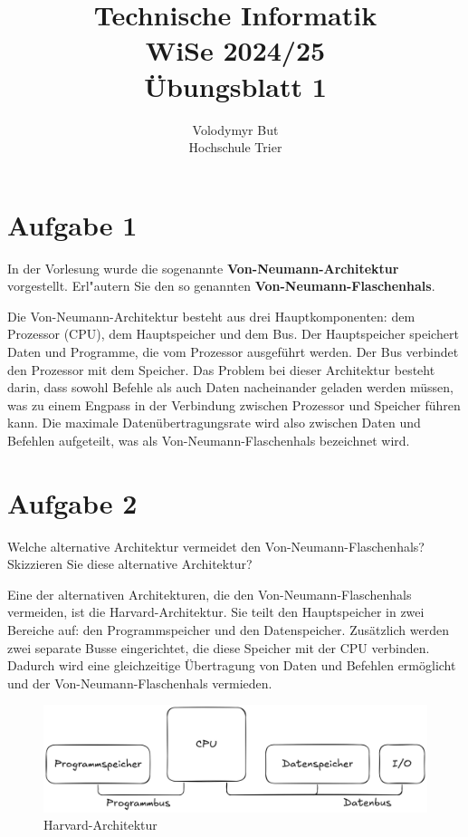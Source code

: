 \documentclass[10pt, oneside]{article}
\title{Technische Informatik\\[10pt]\Large{WiSe 2024/25}\\[15pt]\Large{\"Ubungsblatt 1}}
\author{Volodymyr But\\[10pt]Hochschule Trier}
\date{}
\begin{document}
\sloppy

\maketitle
\vspace{25px}

\section{Aufgabe 1}

In der Vorlesung wurde die sogenannte \textbf{Von-Neumann-Architektur}
vorgestellt. Erl"autern Sie den so genannten \textbf{Von-Neumann-Flaschenhals}.

Die Von-Neumann-Architektur besteht aus drei Hauptkomponenten: dem Prozessor
(CPU), dem Hauptspeicher und dem Bus. Der Hauptspeicher speichert Daten und
Programme, die vom Prozessor ausgeführt werden. Der Bus verbindet den Prozessor
mit dem Speicher. Das Problem bei dieser Architektur besteht darin, dass sowohl
Befehle als auch Daten nacheinander geladen werden müssen, was zu einem Engpass
in der Verbindung zwischen Prozessor und Speicher führen kann. Die maximale
Datenübertragungsrate wird also zwischen Daten und Befehlen aufgeteilt, was als
Von-Neumann-Flaschenhals bezeichnet wird.

\section{Aufgabe 2}

Welche alternative Architektur vermeidet den Von-Neumann-Flaschenhals?
Skizzieren Sie diese alternative Architektur?

Eine der alternativen Architekturen, die den Von-Neumann-Flaschenhals
vermeiden, ist die Harvard-Architektur. Sie teilt den Hauptspeicher in zwei
Bereiche auf: den Programmspeicher und den Datenspeicher. Zusätzlich werden
zwei separate Busse eingerichtet, die diese Speicher mit der CPU verbinden.
Dadurch wird eine gleichzeitige Übertragung von Daten und Befehlen ermöglicht
und der Von-Neumann-Flaschenhals vermieden.

\vspace{10px}
\begin{figure}[h]
    \centering
    \includegraphics[width=1\textwidth]{./assets/harvard-architektur.png}
    \caption{Harvard-Architektur}
\end{figure}
\end{document}
